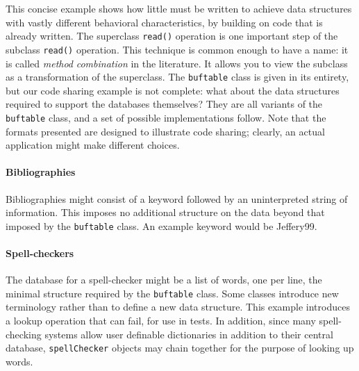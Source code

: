 This concise example shows how little must be written to achieve data
structures with vastly different behavioral characteristics, by
building on code that is already written. The superclass
\texttt{read()} operation is one important step of the subclass
\texttt{read()} operation. This technique is common enough to have a
name: it is called \textit{method
}\textit{combination} in the literature. It
allows you to view the subclass as a transformation of the superclass.
The \texttt{buftable} class is given in its entirety, but our code
sharing example is not complete: what about the data structures
required to support the databases themselves? They are all variants of
the \texttt{buftable} class, and a set of possible implementations
follow. Note that the formats presented are designed to illustrate code
sharing; clearly, an actual application might make different choices. 

\paragraph{Bibliographies}
Bibliographies might consist of a keyword followed by an uninterpreted
string of information. This imposes no additional structure on the data
beyond that imposed by the \texttt{buftable} class. An example keyword
would be Jeffery99. 


\paragraph{Spell-checkers}
The database for a spell-checker might be a list of words, one per
line, the minimal structure required by the \texttt{buftable} class.
Some classes introduce new terminology rather
than to define a new data structure. This example introduces a lookup
operation that can fail, for use in tests. In addition, since many
spell-checking systems allow user definable dictionaries in addition to
their central database, \texttt{spellChecker} objects may chain
together for the purpose of looking up words. 


